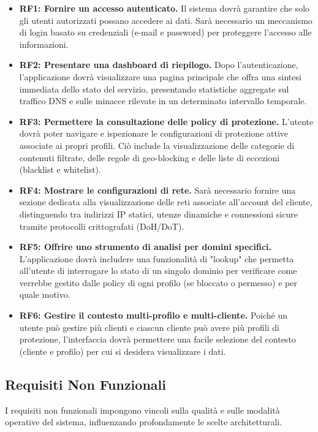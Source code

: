 \documentclass[12pt,a4paper,openright,twoside]{book}
\begin{document}
\begin{itemize}
    \item \textbf{RF1: Fornire un accesso autenticato.} Il sistema dovrà garantire che solo gli utenti autorizzati possano accedere ai dati. Sarà necessario un meccanismo di login basato su credenziali (e-mail e password) per proteggere l'accesso alle informazioni.

    \item \textbf{RF2: Presentare una dashboard di riepilogo.} Dopo l'autenticazione, l'applicazione dovrà visualizzare una pagina principale che offra una sintesi immediata dello stato del servizio, presentando statistiche aggregate sul traffico DNS e sulle minacce rilevate in un determinato intervallo temporale.

    \item \textbf{RF3: Permettere la consultazione delle policy di protezione.} L'utente dovrà poter navigare e ispezionare le configurazioni di protezione attive associate ai propri profili. Ciò include la visualizzazione delle categorie di contenuti filtrate, delle regole di geo-blocking e delle liste di eccezioni (blacklist e whitelist).

    \item \textbf{RF4: Mostrare le configurazioni di rete.} Sarà necessario fornire una sezione dedicata alla visualizzazione delle reti associate all'account del cliente, distinguendo tra indirizzi IP statici, utenze dinamiche e connessioni sicure tramite protocolli crittografati (DoH/DoT).

    \item \textbf{RF5: Offrire uno strumento di analisi per domini specifici.} L'applicazione dovrà includere una funzionalità di "lookup" che permetta all'utente di interrogare lo stato di un singolo dominio per verificare come verrebbe gestito dalle policy di ogni profilo (se bloccato o permesso) e per quale motivo.

    \item \textbf{RF6: Gestire il contesto multi-profilo e multi-cliente.} Poiché un utente può gestire più clienti e ciascun cliente può avere più profili di protezione, l'interfaccia dovrà permettere una facile selezione del contesto (cliente e profilo) per cui si desidera visualizzare i dati.
\end{itemize}

\subsection{Requisiti Non Funzionali}
\label{subsec:req_non_funzionali}
I requisiti non funzionali impongono vincoli sulla qualità e sulle modalità operative del sistema, influenzando profondamente le scelte architetturali.
\end{document}
